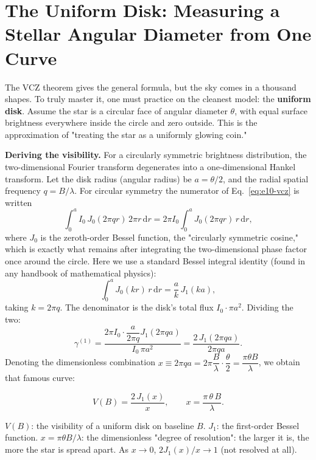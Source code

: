 \section{The Uniform Disk: Measuring a Stellar Angular Diameter from One Curve}
\label{sec:e10-disk}

The VCZ theorem gives the general formula, but the sky comes in a thousand shapes. To truly master it, one must practice on the cleanest model: the \textbf{uniform disk}. Assume the star is a circular face of angular diameter \(\theta\), with equal surface brightness everywhere inside the circle and zero outside. This is the approximation of "treating the star as a uniformly glowing coin."

\textbf{Deriving the visibility.} For a circularly symmetric brightness distribution, the two-dimensional Fourier transform degenerates into a one-dimensional Hankel transform. Let the disk radius (angular radius) be \(a=\theta/2\), and the radial spatial frequency \(q=B/\lambda\). For circular symmetry the numerator of Eq.~\eqref{eq:e10-vcz} is written
\[
  \int_0^{a} I_0\,J_0(2\pi q r)\,2\pi r\,\mathrm dr
  =2\pi I_0\int_0^{a}J_0(2\pi q r)\,r\,\mathrm dr,
\]
where \(J_0\) is the zeroth-order Bessel function, the "circularly symmetric cosine," which is exactly what remains after integrating the two-dimensional phase factor once around the circle. Here we use a standard Bessel integral identity (found in any handbook of mathematical physics):
\[
  \int_0^{a} J_0(k r)\,r\,\mathrm dr=\frac{a}{k}\,J_1(k a),
\]
taking \(k=2\pi q\). The denominator is the disk's total flux \(I_0\cdot\pi a^2\). Dividing the two:
\[
  \gamma^{(1)}
  =\frac{2\pi I_0\cdot\dfrac{a}{2\pi q}J_1(2\pi q a)}{I_0\,\pi a^2}
  =\frac{2\,J_1(2\pi q a)}{2\pi q a}.
\]
Denoting the dimensionless combination \(x\equiv 2\pi q a=2\pi\dfrac{B}{\lambda}\cdot\dfrac{\theta}{2}=\dfrac{\pi\theta B}{\lambda}\), we obtain that famous curve:

\begin{equation}
  V(B)=\frac{2\,J_1(x)}{x},\qquad x=\frac{\pi\,\theta\,B}{\lambda}.
  \label{eq:e10-disk}
\end{equation}
\begin{formulaexplain}
\(V(B)\): the visibility of a uniform disk on baseline \(B\). \(J_1\): the first-order Bessel function. \(x=\pi\theta B/\lambda\): the dimensionless "degree of resolution": the larger it is, the more the star is spread apart. As \(x\to0\), \(2J_1(x)/x\to1\) (not resolved at all).
\end{formulaexplain}

